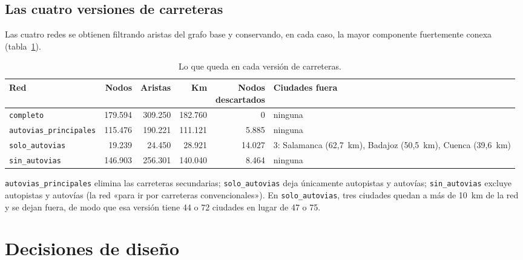\subsection{Las cuatro versiones de carreteras}\label{sec:redes}

Las cuatro redes se obtienen filtrando aristas del grafo base y conservando, en cada caso, la mayor componente fuertemente conexa (tabla~\ref{tab:redes}).

\begin{table}[htbp]
  \centering
  \caption{Lo que queda en cada versión de carreteras.}\label{tab:redes}
  \small
  \begin{tabularx}{\linewidth}{@{}l r r r r X@{}}
    \toprule
    Red & Nodos & Aristas & Km & \makecell[r]{Nodos\\descartados} & Ciudades fuera \\
    \midrule
    \texttt{completo} & 179.594 & 309.250 & 182.760 & 0 & ninguna \\
    \texttt{autovias\_principales} & 115.476 & 190.221 & 111.121 & 5.885 & ninguna \\
    \texttt{solo\_autovias} & 19.239 & 24.450 & 28.921 & 14.027 & 3: Salamanca (62,7~km), Badajoz (50,5~km), Cuenca (39,6~km) \\
    \texttt{sin\_autovias} & 146.903 & 256.301 & 140.040 & 8.464 & ninguna \\
    \bottomrule
  \end{tabularx}
\end{table}

\texttt{autovias\_principales} elimina las carreteras secundarias; \texttt{solo\_autovias} deja únicamente autopistas y autovías; \texttt{sin\_autovias} excluye autopistas y autovías (la red «para ir por carreteras convencionales»).
En \texttt{solo\_autovias}, tres ciudades quedan a más de 10~km de la red y se dejan fuera, de modo que esa versión tiene 44 o 72 ciudades en lugar de 47 o 75.

\section{Decisiones de diseño}

